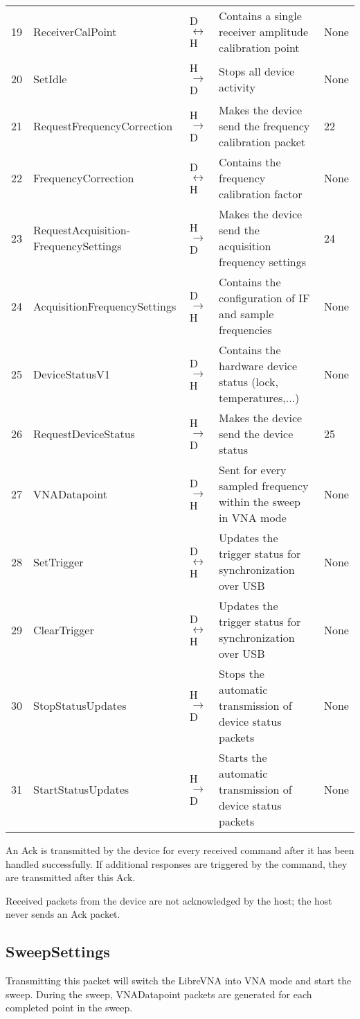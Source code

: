 \documentclass[a4paper,11pt]{article}
\begin{document}
\begin{ThreePartTable}
\begin{longtable}{p{} |  p{} | p{} | p{} |p{} }
19 & ReceiverCalPoint & D$\leftrightarrow$H & Contains a single receiver amplitude calibration point &None \\
20 & SetIdle & H$\rightarrow$D & Stops all device activity & None \\
21 & RequestFrequencyCorrection & H$\rightarrow$D & Makes the device send the frequency calibration packet &22 \\
22 & FrequencyCorrection & D$\leftrightarrow$H & Contains the frequency calibration factor & None\\
23 & RequestAcquisition-FrequencySettings & H$\rightarrow$D & Makes the device send the acquisition frequency settings & 24\\
24 & AcquisitionFrequencySettings & D$\rightarrow$H & Contains the configuration of IF and sample frequencies &None \\
25 & DeviceStatusV1 & D$\rightarrow$H & Contains the hardware device status (lock, temperatures,...) &None \\
26 & RequestDeviceStatus & H$\rightarrow$D & Makes the device send the device status &25 \\
27 & VNADatapoint & D$\rightarrow$H & Sent for every sampled frequency within the sweep in VNA mode &None \\
28 & SetTrigger & D$\leftrightarrow$H & Updates the trigger status for synchronization over USB & None\\
29 & ClearTrigger & D$\leftrightarrow$H & Updates the trigger status for synchronization over USB & None\\
30 & StopStatusUpdates & H$\rightarrow$D & Stops the automatic transmission of device status packets & None\\
31 & StartStatusUpdates & H$\rightarrow$D & Starts the automatic transmission of device status packets & None\\
\end{longtable}   
\end{ThreePartTable}
An Ack is transmitted by the device for every received command after it has been handled successfully. If additional responses are triggered by the command, they are transmitted after this Ack.

Received packets from the device are not acknowledged by the host; the host never sends an Ack packet.

\subsection{SweepSettings}
Transmitting this packet will switch the LibreVNA into VNA mode and start the sweep. During the sweep, VNADatapoint packets are generated for each completed point in the sweep.
\end{document}
